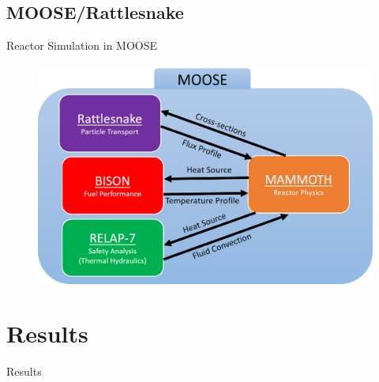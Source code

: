 \documentclass[8pt,xcolor=dvipnames]{beamer}
\begin{document}
\subsection{MOOSE/Rattlesnake}

\begin{frame}{Reactor Simulation in MOOSE}

\begin{figure}
\includegraphics[width=\linewidth]{figures/mammoth.png}
\end{figure}

\end{frame}

\section{Results}

\begin{frame}{Results}

\begin{multicols}{2}
\tableofcontents[currentsection]
\end{multicols}

\end{frame}
\end{document}
